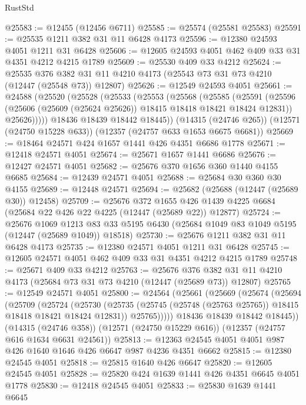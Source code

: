 \begin{lexlean}{RustStd}
\begin{coremodule}
@25583 := @12455 (@12456 @6711)
@25585 := @25574 (@25581 @25583)
@25591 := @25535 @1211 @382 @31 @11 @6428 @4173
@25596 := @12380 @24593 @4051 @1211 @31 @6428
@25606 := @12605 @24593 @4051 @462 @409 @33 @31 @4351 @4212 @4215 @1789
@25609 := @25530 @409 @33 @4212
@25624 := @25535
    @376
    @382
    @31
    @11
    @4210
    @4173
    (@25543 @73 @31 @73 @4210 (@12447 (@25548 @73)) @12807)
@25626 := @12549 @24593 @4051
@25661 := @24588
    (@25520
      (@25528
        (@25533
          (@25553
            (@25568
              (@25585
                (@25591
                  (@25596 (@25606 (@25609 (@25624 @25626)) @18415 @18418 @18421 @18424 @12831))
                  @25626)))))
        @18436
        @18439
        @18442
        @18445))
    (@14315 (@24746 @265))
    (@12571 (@24750 @15228 @633))
    (@12357 (@24757 @633 @1653 @6675 @6681))
@25669 := @18464 @24571 @424 @1657 @1441 @426 @4351 @6686 @1778
@25671 := @12418 @24571 @4051
@25674 := @25671 @1657 @1441 @6686
@25676 := @12427 @24571 @4051
@25682 := @25676 @370 @1656 @360 @1440 @4155 @6685
@25684 := @12439 @24571 @4051
@25688 := @25684 @30 @360 @30 @4155
@25689 := @12448 @24571
@25694 := @25682 (@25688 (@12447 (@25689 @30)) @12458)
@25709 := @25676
    @372
    @1655
    @426
    @1439
    @4225
    @6684
    (@25684 @22 @426 @22 @4225 (@12447 (@25689 @22)) @12877)
@25724 := @25676
    @1069
    @1213
    @83
    @33
    @5195
    @6430
    (@25684 @1049 @83 @1049 @5195 (@12447 (@25689 @1049)) @18518)
@25730 := @25676 @1211 @382 @31 @11 @6428 @4173
@25735 := @12380 @24571 @4051 @1211 @31 @6428
@25745 := @12605 @24571 @4051 @462 @409 @33 @31 @4351 @4212 @4215 @1789
@25748 := @25671 @409 @33 @4212
@25763 := @25676
    @376
    @382
    @31
    @11
    @4210
    @4173
    (@25684 @73 @31 @73 @4210 (@12447 (@25689 @73)) @12807)
@25765 := @12549 @24571 @4051
@25800 := @24564
    (@25661
      (@25669
        (@25674
          (@25694
            (@25709
              (@25724
                (@25730
                  (@25735 (@25745 (@25748 (@25763 @25765)) @18415 @18418 @18421 @18424 @12831))
                  @25765)))))
        @18436
        @18439
        @18442
        @18445))
    (@14315 (@24746 @358))
    (@12571 (@24750 @15229 @616))
    (@12357 (@24757 @616 @1634 @6631 @24561))
@25813 := @12363 @24545 @4051 @4051 @987 @426 @1640 @1646 @426 @6647 @987 @4236 @4351 @6662
@25815 := @12380 @24545 @4051
@25818 := @25815 @1640 @426 @6647
@25820 := @12605 @24545 @4051
@25828 := @25820 @424 @1639 @1441 @426 @4351 @6645 @4051 @1778
@25830 := @12418 @24545 @4051
@25833 := @25830 @1639 @1441 @6645

\end{coremodule}
\end{lexlean}
